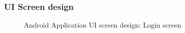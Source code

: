 \newpage
\subsubsection{UI Screen design}
\vspace{0.2in}

\begin{figure}[H]
\centering	
{}
\caption{Android Application UI screen design: Login screen}
\end{figure}

